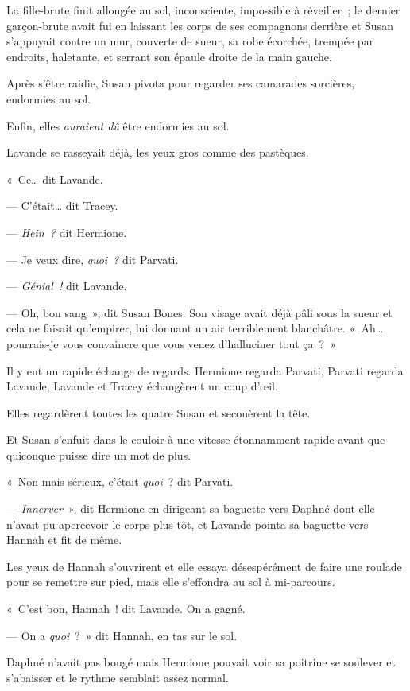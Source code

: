 La fille-brute finit allongée au sol, inconsciente, impossible à réveiller~; le dernier garçon-brute avait fui en laissant les corps de ses compagnons derrière et Susan s'appuyait contre un mur, couverte de sueur, sa robe écorchée, trempée par endroits, haletante, et serrant son épaule droite de la main gauche.

Après s'être raidie, Susan pivota pour regarder ses camarades sorcières, endormies au sol.

Enfin, elles \emph{auraient dû} être endormies au sol.

Lavande se rasseyait déjà, les yeux gros comme des pastèques.

«~Ce… dit Lavande.

--- C'était… dit Tracey.

--- \emph{Hein~?} dit Hermione.

--- Je veux dire, \emph{quoi~?} dit Parvati.

--- \emph{Génial~!} dit Lavande.

--- Oh, bon sang~», dit Susan Bones.
Son visage avait déjà pâli sous la sueur et cela ne faisait qu'empirer, lui donnant un air terriblement blanchâtre.
«~Ah… pourrais-je vous convaincre que vous venez d'halluciner tout ça~?~»

Il y eut un rapide échange de regards.
Hermione regarda Parvati, Parvati regarda Lavande, Lavande et Tracey échangèrent un coup d'œil.

Elles regardèrent toutes les quatre Susan et secouèrent la tête.

Et Susan s'enfuit dans le couloir à une vitesse étonnamment rapide avant que quiconque puisse dire un mot de plus.

«~Non mais sérieux, c'était \emph{quoi}~? dit Parvati.

--- \emph{Innerver}~», dit Hermione en dirigeant sa baguette vers Daphné dont elle n'avait pu apercevoir le corps plus tôt, et Lavande pointa sa baguette vers Hannah et fit de même.

Les yeux de Hannah s'ouvrirent et elle essaya désespérément de faire une roulade pour se remettre sur pied, mais elle s'effondra au sol à mi-parcours.

«~C'est bon, Hannah~! dit Lavande.
On a gagné.

--- On a \emph{quoi}~?~»
dit Hannah, en tas sur le sol.

Daphné n'avait pas bougé mais Hermione pouvait voir sa poitrine se soulever et s'abaisser et le rythme semblait assez normal.

